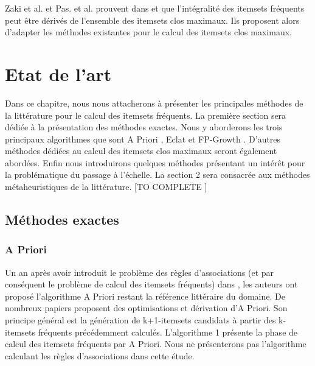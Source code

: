 \documentclass[a4paper,10pt]{report}
\begin{document}
Zaki et al. et Pas. et al. prouvent dans \cite{ZAK99} et \cite{PAS99} que l'intégralité des itemsets fréquents peut être dérivés de l'ensemble des itemsets clos maximaux. Ils proposent alors d'adapter les méthodes existantes pour le calcul des itemsets clos maximaux. \\

\chapter{Etat de l'art}
Dans ce chapitre, nous nous attacherons à présenter les principales méthodes de la littérature pour le calcul des itemsets fréquents. La première section sera dédiée à la présentation des méthodes exactes. Nous y aborderons les trois principaux algorithmes que sont A Priori \cite{AGR94}, Eclat \cite{ZAK00} et FP-Growth \cite{HAN04}. D'autres méthodes dédiées au calcul des itemsets clos maximaux seront également abordées. Enfin nous introduirons quelques méthodes présentant un intérêt pour la problématique du passage à l'échelle. La section 2 sera consacrée aux méthodes métaheuristiques de la littérature. [TO COMPLETE ] \\

\section{ Méthodes exactes}

\subsection{A Priori}

	Un an après avoir introduit le problème des règles d'associations (et par conséquent le problème de calcul des itemsets fréquents) dans \cite{AGR93}, les auteurs ont proposé l'algorithme A Priori \cite{AGR94} restant la référence littéraire du domaine. De nombreux papiers proposent des optimisations et dérivation d'A Priori. Son principe général est la génération de k+1-itemsets candidats à partir des k-itemsets fréquents précédemment calculés. L'algorithme 1 présente la phase de calcul des itemsets fréquents par A Priori. Nous ne présenterons pas l'algorithme calculant les règles d'associations dans cette étude. \\ 
\end{document}

